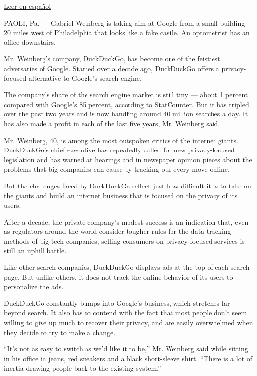 \href{https://www.nytimes3xbfgragh.onion/es/2019/07/22/privacidad-google-duckduckgo/}{Leer
en español}

PAOLI, Pa. --- Gabriel Weinberg is taking aim at Google from a small
building 20 miles west of Philadelphia that looks like a fake castle. An
optometrist has an office downstairs.

Mr. Weinberg's company, DuckDuckGo, has become one of the feistiest
adversaries of Google. Started over a decade ago, DuckDuckGo offers a
privacy-focused alternative to Google's search engine.

The company's share of the search engine market is still tiny --- about
1 percent compared with Google's 85 percent, according to
\href{http://gs.statcounter.com/about}{StatCounter}. But it has tripled
over the past two years and is now handling around 40 million searches a
day. It has also made a profit in each of the last five years, Mr.
Weinberg said.

Mr. Weinberg, 40, is among the most outspoken critics of the internet
giants. DuckDuckGo's chief executive has repeatedly called for new
privacy-focused legislation and has warned at hearings and in
\href{https://www.nytimes3xbfgragh.onion/2019/06/19/opinion/facebook-google-privacy.html}{newspaper
opinion pieces} about the problems that big companies can cause by
tracking our every move online.

But the challenges faced by DuckDuckGo reflect just how difficult it is
to take on the giants and build an internet business that is focused on
the privacy of its users.

After a decade, the private company's modest success is an indication
that, even as regulators around the world consider tougher rules for the
data-tracking methods of big tech companies, selling consumers on
privacy-focused services is still an uphill battle.

Like other search companies, DuckDuckGo displays ads at the top of each
search page. But unlike others, it does not track the online behavior of
its users to personalize the ads.

DuckDuckGo constantly bumps into Google's business, which stretches far
beyond search. It also has to contend with the fact that most people
don't seem willing to give up much to recover their privacy, and are
easily overwhelmed when they decide to try to make a change.

``It's not as easy to switch as we'd like it to be,'' Mr. Weinberg said
while sitting in his office in jeans, red sneakers and a black
short-sleeve shirt. ``There is a lot of inertia drawing people back to
the existing system.''

